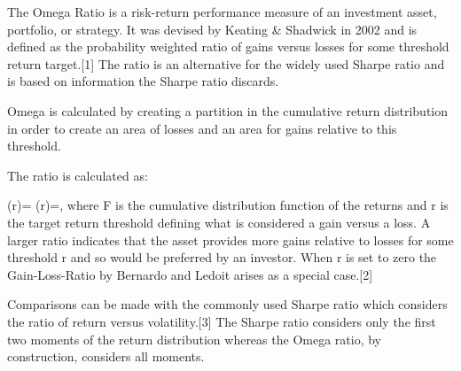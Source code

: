 The Omega Ratio is a risk-return performance measure of an investment asset, portfolio, or strategy. It was devised by Keating & Shadwick in 2002 and is defined as the probability weighted ratio of gains versus losses for some threshold return target.[1] The ratio is an alternative for the widely used Sharpe ratio and is based on information the Sharpe ratio discards.

Omega is calculated by creating a partition in the cumulative return distribution in order to create an area of losses and an area for gains relative to this threshold.

The ratio is calculated as:

{\displaystyle \Omega (r)={}} \Omega (r)={},
where F is the cumulative distribution function of the returns and r is the target return threshold defining what is considered a gain versus a loss. A larger ratio indicates that the asset provides more gains relative to losses for some threshold r and so would be preferred by an investor. When r is set to zero the Gain-Loss-Ratio by Bernardo and Ledoit arises as a special case.[2]

Comparisons can be made with the commonly used Sharpe ratio which considers the ratio of return versus volatility.[3] The Sharpe ratio considers only the first two moments of the return distribution whereas the Omega ratio, by construction, considers all moments.
